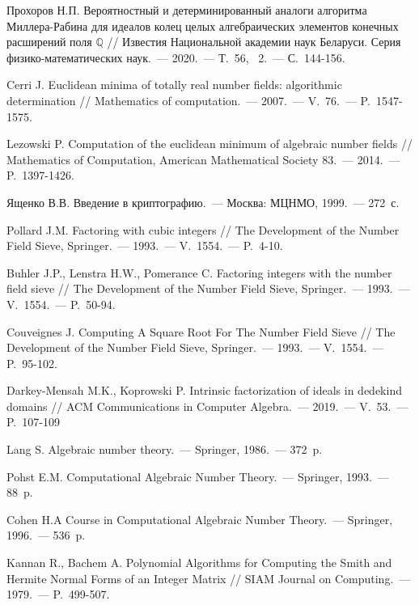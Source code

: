 \documentclass[_00_dissertation.tex]{subfiles}
\begin{document}
\begin{thebibliography}{99}
    Прохоров Н.П. Вероятностный и детерминированный аналоги алгоритма Миллера-Рабина для идеалов колец целых алгебраических элементов конечных расширений поля $\mathbb{Q}$ // Известия Национальной академии наук Беларуси. Серия физико-математических наук.~--- 2020.~--- Т.~56, \textnumero~2.~--- С.~144-156.

    Cerri J. Euclidean minima of totally real number fields: algorithmic determination // Mathematics of computation.~--- 2007.~--- V.~76.~--- P.~1547-1575.

    Lezowski P. Computation of the euclidean minimum of algebraic number fields // Mathematics of Computation, American Mathematical Society 83.~--- 2014.~--- P.~1397-1426.

    Ященко В.В. Введение в криптографию.~--- Москва: МЦНМО, 1999.~--- 272~с.
    
    Pollard J.M. Factoring with cubic integers // The Development of the Number Field Sieve, Springer.~--- 1993.~--- V.~1554.~--- P.~4-10.

    Buhler J.P., Lenstra H.W., Pomerance C. Factoring integers with the number field sieve // The Development of the Number Field Sieve, Springer.~--- 1993.~--- V.~1554.~--- P.~50-94.

    Couveignes J. Computing A Square Root For The Number Field Sieve // The Development of the Number Field Sieve, Springer.~--- 1993.~--- V.~1554.~--- P.~95-102.

    Darkey-Mensah M.K., Koprowski P. Intrinsic factorization of ideals in dedekind domains // ACM Communications in Computer Algebra.~--- 2019.~--- V.~53.~--- P.~107-109

    Lang S. Algebraic number theory.~--- Springer, 1986.~--- 372~p.

    Pohst E.M. Computational Algebraic Number Theory.~--- Springer, 1993.~--- 88~p.

    Cohen H.A Course in Computational Algebraic Number Theory.~--- Springer, 1996.~--- 536~p.

    Kannan R., Bachem A. Polynomial Algorithms for Computing the Smith and Hermite Normal Forms of an Integer Matrix // SIAM Journal on Computing.~--- 1979.~--- P.~499-507.


\end{thebibliography}
\end{document}
